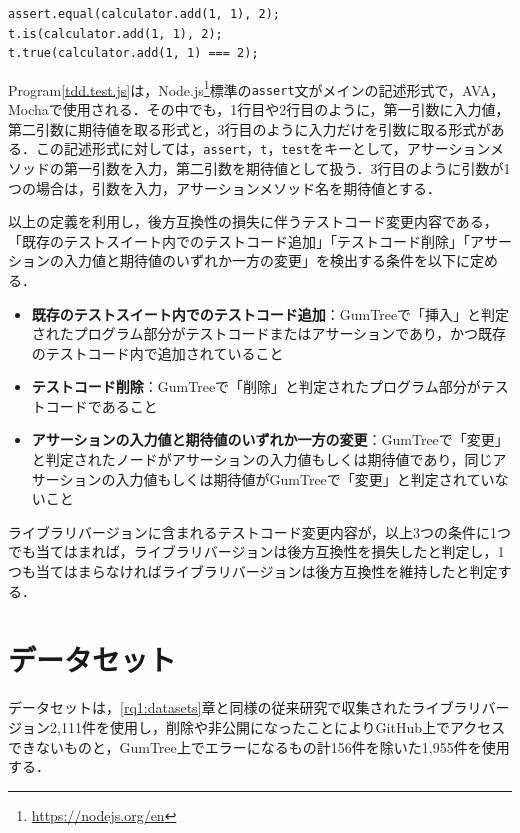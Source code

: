 \documentclass[11pt,dvipdfmx]{jreport}
\begin{document}
\begin{lstlisting}[caption=アサーション例2, label=tdd.test.js]
assert.equal(calculator.add(1, 1), 2);
t.is(calculator.add(1, 1), 2);  
t.true(calculator.add(1, 1) === 2);
\end{lstlisting}

Program\ref{tdd.test.js}は，Node.js\footnote{\url{https://nodejs.org/en}}標準の{\verb|assert|}文がメインの記述形式で，AVA，Mochaで使用される．その中でも，1行目や2行目のように，第一引数に入力値，第二引数に期待値を取る形式と，3行目のように入力だけを引数に取る形式がある．この記述形式に対しては，{\verb|assert|}，{\verb|t|}，{\verb|test|}をキーとして，アサーションメソッドの第一引数を入力，第二引数を期待値として扱う．3行目のように引数が1つの場合は，引数を入力，アサーションメソッド名を期待値とする．

以上の定義を利用し，後方互換性の損失に伴うテストコード変更内容である，「既存のテストスイート内でのテストコード追加」「テストコード削除」「アサーションの入力値と期待値のいずれか一方の変更」を検出する条件を以下に定める．

\begin{itemize}
  \item \textbf{既存のテストスイート内でのテストコード追加}：GumTreeで「挿入」と判定されたプログラム部分がテストコードまたはアサーションであり，かつ既存のテストコード内で追加されていること
  \item \textbf{テストコード削除}：GumTreeで「削除」と判定されたプログラム部分がテストコードであること
  \item \textbf{アサーションの入力値と期待値のいずれか一方の変更}：GumTreeで「変更」と判定されたノードがアサーションの入力値もしくは期待値であり，同じアサーションの入力値もしくは期待値がGumTreeで「変更」と判定されていないこと
\end{itemize}

ライブラリバージョンに含まれるテストコード変更内容が，以上3つの条件に1つでも当てはまれば，ライブラリバージョンは後方互換性を損失したと判定し，1つも当てはまらなければライブラリバージョンは後方互換性を維持したと判定する．

\section{データセット}
データセットは，\ref{rq1:datasets}章と同様の従来研究\cite{matsuda}で収集されたライブラリバージョン2,111件を使用し，削除や非公開になったことによりGitHub上でアクセスできないものと，GumTree上でエラーになるもの計156件を除いた1,955件を使用する．
\end{document}
